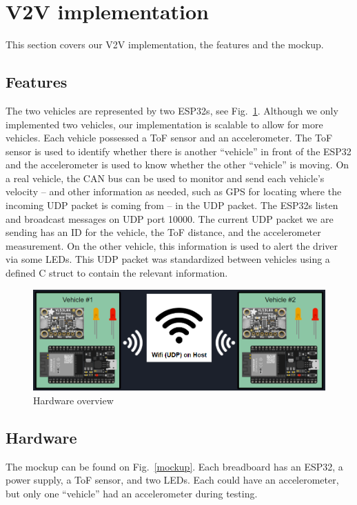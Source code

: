\documentclass[conference]{IEEEtran}
\begin{document}
\section{V2V implementation}
This section covers our V2V implementation, the features and the mockup.

\subsection{Features}
The two vehicles are represented by two ESP32s, see Fig.~\ref{vehicle_image}.
Although we only implemented two vehicles, our implementation is scalable to
allow for more vehicles. Each vehicle possessed a ToF sensor and an
accelerometer. The ToF sensor is used to identify whether there is another
``vehicle'' in front of the ESP32 and the accelerometer is used to know whether
the other ``vehicle'' is moving. On a real vehicle, the CAN bus can be used to
monitor and send each vehicle's velocity -- and other information as needed,
such as GPS for locating where the incoming UDP packet is coming from -- in the
UDP packet. The ESP32s listen and broadcast messages on UDP port 10000.  The
current UDP packet we are sending has an ID for the vehicle, the ToF distance,
and the accelerometer measurement. On the other vehicle, this information is
used to alert the driver via some LEDs. This UDP packet was standardized between
vehicles using a defined C struct to contain the relevant information.

\begin{figure}[htbp]
\centerline{\includegraphics[width=\linewidth]{pics/vehicle_image.png}}
\caption{Hardware overview}
\label{vehicle_image}
\end{figure}

\subsection{Hardware}
The mockup can be found on Fig.~\ref{mockup}. Each breadboard has an ESP32, a
power supply, a ToF sensor, and two LEDs. Each could have an accelerometer, but
only one ``vehicle'' had an accelerometer during testing.
\end{document}
